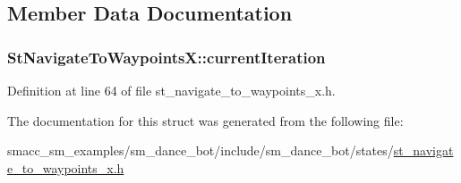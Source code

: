\subsection{Member Data Documentation}
\subsubsection[{\texorpdfstring{current\+Iteration}{currentIteration}}]{ St\+Navigate\+To\+Waypoints\+X\+::current\+Iteration}\hypertarget{structStNavigateToWaypointsX_a2f597fd0ee0258ef66506e98d55e8060}{}\label{structStNavigateToWaypointsX_a2f597fd0ee0258ef66506e98d55e8060}


Definition at line 64 of file st\+\_\+navigate\+\_\+to\+\_\+waypoints\+\_\+x.\+h.



The documentation for this struct was generated from the following file\+:\begin{DoxyCompactItemize}
\item 
smacc\+\_\+sm\+\_\+examples/sm\+\_\+dance\+\_\+bot/include/sm\+\_\+dance\+\_\+bot/states/\hyperlink{st__navigate__to__waypoints__x_8h}{st\+\_\+navigate\+\_\+to\+\_\+waypoints\+\_\+x.\+h}\end{DoxyCompactItemize}
